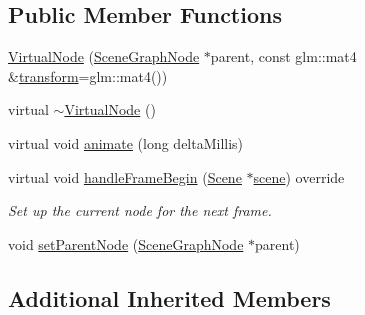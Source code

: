 \subsection*{Public Member Functions}
\begin{DoxyCompactItemize}
\item 
\hyperlink{classmotorcar_1_1VirtualNode_acee2e50a0321f81714a7984ce2effbbd}{Virtual\-Node} (\hyperlink{classmotorcar_1_1SceneGraphNode}{Scene\-Graph\-Node} $\ast$parent, const glm\-::mat4 \&\hyperlink{classmotorcar_1_1SceneGraphNode_ad96e79fdd739ac8223a3128003be391a}{transform}=glm\-::mat4())
\item 
virtual \hyperlink{classmotorcar_1_1VirtualNode_afb80a6d7b8ac5b3137357873d63a31c8}{$\sim$\-Virtual\-Node} ()
\item 
virtual void \hyperlink{classmotorcar_1_1VirtualNode_a43eca360af74fd3684a8f3d62a6aff35}{animate} (long delta\-Millis)
\item 
virtual void \hyperlink{classmotorcar_1_1VirtualNode_aae6c8f3752b46e84c65eb9fcab542f60}{handle\-Frame\-Begin} (\hyperlink{classmotorcar_1_1Scene}{Scene} $\ast$\hyperlink{classmotorcar_1_1SceneGraphNode_aa14e637ed4ae98f77e28941a4b5cfdd8}{scene}) override
\begin{DoxyCompactList}\small\item\em Set up the current node for the next frame. \end{DoxyCompactList}\item 
void \hyperlink{classmotorcar_1_1VirtualNode_aacea6d6974e649331232372d440b6505}{set\-Parent\-Node} (\hyperlink{classmotorcar_1_1SceneGraphNode}{Scene\-Graph\-Node} $\ast$parent)
\end{DoxyCompactItemize}
\subsection*{Additional Inherited Members}


